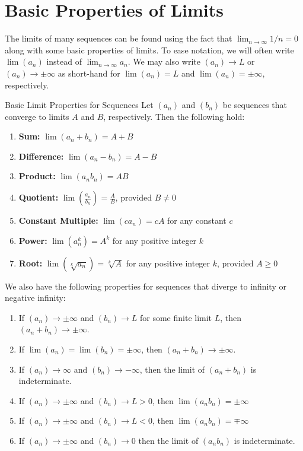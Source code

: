 \documentclass{article}
\begin{document}
\section{Basic Properties of Limits}\label{sec:basic-limits}

The limits of many sequences can be found using the fact that \(\lim_{n \to \infty} 1/n = 0\) along with some basic properties of limits. To ease notation, we will often write \(\lim(a_n)\) instead of \(\lim_{n \to \infty} a_n\). We may also write \((a_n)\to L\) or \((a_n)\to\pm\infty\) as short-hand for \(\lim(a_n) = L\) and \(\lim(a_n) = \pm\infty\), respectively.

\begin{calloutbox}{Basic Limit Properties for Sequences}\label{box:basic-limit-laws}
Let \((a_n)\) and \((b_n)\) be sequences that converge to limits \(A\) and \(B\), respectively. Then the following hold:
\begin{enumerate}
    \item \textbf{Sum:} \(\lim(a_n + b_n) = A + B\)
    \item \textbf{Difference:} \(\lim(a_n - b_n) = A - B\)
    \item \textbf{Product:} \(\lim(a_n b_n) = AB\)
    \item \textbf{Quotient:} \(\lim\left(\frac{a_n}{b_n}\right) = \frac{A}{B}\), provided \(B \neq 0\)
    \item \textbf{Constant Multiple:} \(\lim(c a_n) = cA\) for any constant \(c\)
    \item \textbf{Power:} \(\lim(a_n^k) = A^k\) for any positive integer \(k\)
    \item \textbf{Root:} \(\lim\left(\sqrt[k]{a_n}\right) = \sqrt[k]{A}\) for any positive integer \(k\), provided \(A \geq 0\)
\end{enumerate}
We also have the following properties for sequences that diverge to infinity or negative infinity:
\begin{enumerate}[resume]
    \item If \((a_n)\to\pm\infty\) and \((b_n)\to L\) for some finite limit \(L\), then \((a_n + b_n)\to\pm\infty\).
    \item If \(\lim(a_n)=\lim(b_n)=\pm\infty\), then \((a_n + b_n)\to\pm\infty\).
    \item If \((a_n)\to\infty\) and \((b_n)\to-\infty\), then the limit of \((a_n + b_n)\) is indeterminate.
    \item If \((a_n)\to\pm\infty\) and \((b_n)\to L>0\), then \(\lim(a_n b_n) = \pm\infty\)
    \item If \((a_n)\to\pm\infty\) and \((b_n)\to L<0\), then \(\lim(a_n b_n) = \mp\infty\)
    \item If \((a_n)\to\pm\infty\) and \((b_n)\to 0\) then the limit of \((a_nb_n)\) is indeterminate.
\end{enumerate} 
\end{calloutbox}
\end{document}
